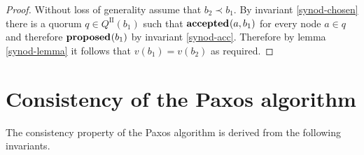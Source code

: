 \documentclass[journal]{IEEEtran}
\begin{document}
\begin{proof} Without loss of generality assume that ${b_2 \prec b_1}$. By
invariant \ref{synod-chosen} there is a quorum $q \in Q^\textrm{II}(b_1)$ such
that $\mathbf{accepted}_{}(a,b_1)$ for every node $a \in q$ and therefore $\mathbf{proposed}_{}(b_1)$ by
invariant \ref{synod-acc}.  Therefore by lemma \ref{synod-lemma} it follows
that $v(b_1) = v(b_2)$ as required.  \end{proof}

\section{Consistency of the Paxos algorithm}\label{paxos-invariants}

The consistency property of the Paxos algorithm is derived from the following
invariants.
\end{document}
